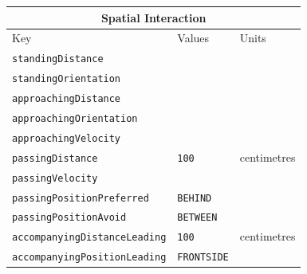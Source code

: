 \documentclass{CSSRforAfrica}
\begin{document}
\begin{table}[H]
\begin{center}
\begin{tabular}{|l l l|}
\hline \hline
\multicolumn{3}{|c|}{{\small \bf Spatial Interaction}} \\
\hline \hline
 {\small Key  }                                                            &  {\small Values }     &                               {\small Units }       \\
\hline
{\footnotesize \verb+standingDistance+} 	           & {\footnotesize \verb++ } \vspace{-1mm} & {\footnotesize  } \\
{\footnotesize \verb+standingOrientation+} 	           & {\footnotesize \verb++} \vspace{-1mm}  & {\footnotesize  }  \\
{\footnotesize \verb+approachingDistance+} 	   & {\footnotesize \verb++} \vspace{-1mm} & {\footnotesize  } \\
{\footnotesize \verb+approachingOrientation+} 	   & {\footnotesize \verb++} \vspace{-1mm} & {\footnotesize  } \\
{\footnotesize \verb+approachingVelocity+} 	           & {\footnotesize \verb++} \vspace{-1mm} & {\footnotesize  } \\
{\footnotesize \verb+passingDistance+} 	           & {\footnotesize \verb+100+} \vspace{-1mm} & {\footnotesize  centimetres} \\
{\footnotesize \verb+passingVelocity+} 	                  & {\footnotesize \verb++  } \vspace{-1mm} & {\footnotesize  } \\
{\footnotesize \verb+passingPositionPreferred+} 	  & {\footnotesize \verb+BEHIND+ } \vspace{-1mm} & {\footnotesize  } \\
{\footnotesize \verb+passingPositionAvoid+}          & {\footnotesize \verb+BETWEEN+} \vspace{-1mm} & {\footnotesize  } \\ 
{\footnotesize \verb+accompanyingDistanceLeading+}  & {\footnotesize \verb+100+} \vspace{-1mm} & {\footnotesize  centimetres} \\
{\footnotesize \verb+accompanyingPositionLeading+} 	   & {\footnotesize \verb+FRONTSIDE+} \vspace{-1mm} & {\footnotesize  } \\

\end{tabular}
\end{center}
\end{table}
\end{document}
